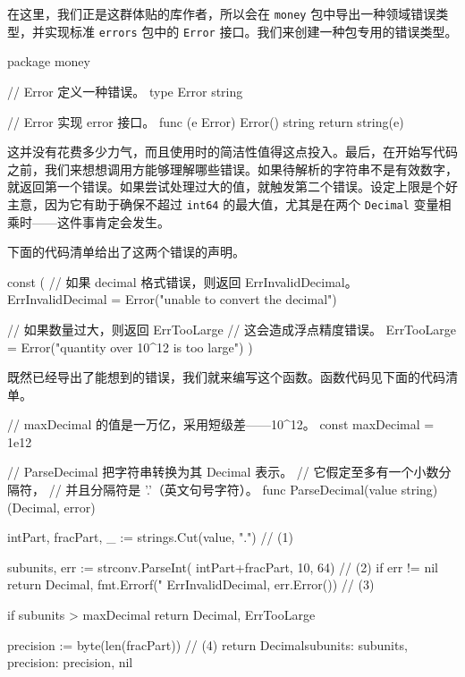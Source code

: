在这里，我们正是这群体贴的库作者，所以会在 \texttt{money} 包中导出一种领域错误类型，并实现标准 \texttt{errors} 包中的 \texttt{Error} 接口。我们来创建一种包专用的错误类型。

\begin{gocode}[title={代码清单 6.7 \texttt{errors.go}：\texttt{money} 包的自定义错误类型}]
package money

// Error 定义一种错误。
type Error string

// Error 实现 error 接口。
func (e Error) Error() string {
    return string(e)
}
\end{gocode}

这并没有花费多少力气，而且使用时的简洁性值得这点投入。最后，在开始写代码之前，我们来想想调用方能够理解哪些错误。如果待解析的字符串不是有效数字，就返回第一个错误。如果尝试处理过大的值，就触发第二个错误。设定上限是个好主意，因为它有助于确保不超过 \texttt{int64} 的最大值，尤其是在两个 \texttt{Decimal} 变量相乘时——这件事肯定会发生。

下面的代码清单给出了这两个错误的声明。

\begin{gocode}[title={代码清单 6.8 \texttt{decimal.go}：导出错误}]
const (
    // 如果 decimal 格式错误，则返回 ErrInvalidDecimal。
    ErrInvalidDecimal = Error("unable to convert the decimal")

    // 如果数量过大，则返回 ErrTooLarge
    // 这会造成浮点精度错误。
    ErrTooLarge = Error("quantity over 10^12 is too large")
)
\end{gocode}

既然已经导出了能想到的错误，我们就来编写这个函数。函数代码见下面的代码清单。

\begin{gocode}[title={代码清单 6.9 \texttt{decimal.go}：\texttt{ParseDecimal} 函数}]
// maxDecimal 的值是一万亿，采用短级差——10^12。
const maxDecimal = 1e12

// ParseDecimal 把字符串转换为其 Decimal 表示。
// 它假定至多有一个小数分隔符，
// 并且分隔符是 '.'（英文句号字符）。
func ParseDecimal(value string) (Decimal, error) {
    intPart, fracPart, _ := strings.Cut(value, ".") // (1)

    subunits, err := strconv.ParseInt(
        intPart+fracPart, 10, 64) // (2)
    if err != nil {
        return Decimal{}, fmt.Errorf("%
            ErrInvalidDecimal, err.Error()) // (3)
    }

    if subunits > maxDecimal {
        return Decimal{}, ErrTooLarge
    }

    precision := byte(len(fracPart)) // (4)
     return Decimal{subunits: subunits, precision: precision}, nil
}
\end{gocode}

